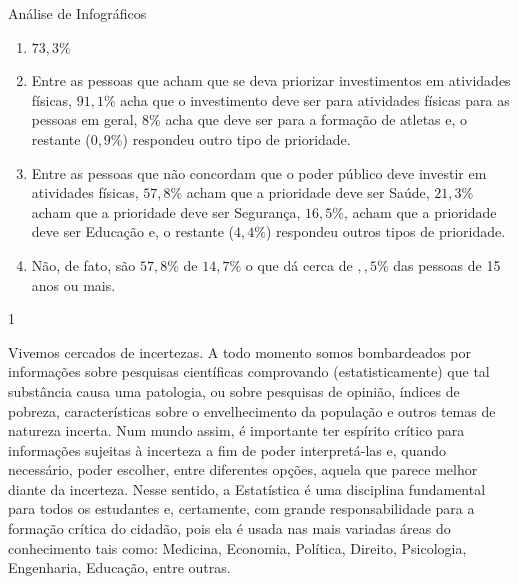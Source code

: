 \begin{answer}{Análise de Infográficos}
{\begin{enumerate}[itemsep=2pt]
\item $73,3$\%

\item Entre as pessoas que acham que se deva priorizar investimentos em atividades físicas, $91{,}1\%$ acha que o investimento deve ser para atividades físicas para as pessoas em geral, $8\%$ acha que deve ser para a formação de atletas e, o restante ($0{,}9\%$) respondeu outro tipo de prioridade.

\item Entre as pessoas que não concordam que o poder público deve investir em atividades físicas, $57{,}8$\% acham que a prioridade deve ser Saúde, $21{,}3\%$ acham que a prioridade deve ser Segurança, $16{,}5\%$, acham que a prioridade deve ser Educação e, o restante ($4{,}4\%$) respondeu outros tipos de prioridade.

\item Não, de fato, são $57{,}8\%$ de $14{,}7\%$ o que dá cerca de ${,},5\%$ das pessoas de 15 anos ou mais.

\end{enumerate}
}{1}
\end{answer}

\label{est1-exp-1}
Vivemos cercados de incertezas. A todo momento somos bombardeados por informações sobre pesquisas científicas comprovando (estatisticamente) que tal substância causa uma patologia, ou sobre pesquisas de opinião, índices de pobreza, características sobre o envelhecimento da população e outros temas de natureza incerta. Num mundo assim, é importante ter espírito crítico para informações sujeitas à incerteza a fim de poder interpretá-las e, quando necessário, poder escolher, entre diferentes opções, aquela que parece melhor diante da incerteza. Nesse sentido, a Estatística é uma disciplina fundamental para todos os estudantes e, certamente, com grande responsabilidade para a formação crítica do cidadão, pois ela é usada nas mais variadas áreas do conhecimento tais como: Medicina, Economia, Política, Direito, Psicologia, Engenharia, Educação, entre outras.


